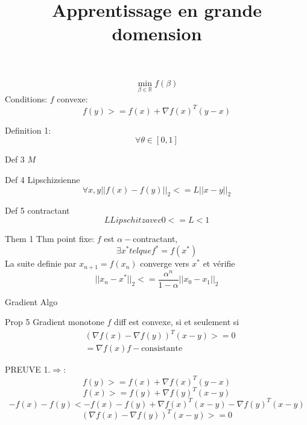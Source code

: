\documentclass{article}
\title{Apprentissage en grande domension}
\begin{document}
\maketitle
\pagebreak

\begin{equation}
\min_{\beta\in\mathbb{R}} f(\beta)
\end{equation}
Conditions:
$f$ convexe:
\begin{equation}
f(y)>=f(x)+\nabla f(x)^T(y-x)
\end{equation}


Definition 1:
\begin{equation}
\forall \theta\in [0,1]
\end{equation}


Def 3 $M$ 

Def 4 Lipschizsienne
\begin{equation}
\forall x,y ||f(x)-f(y)||_2<=L||x-y||_2
\end{equation}

Def 5 contractant
\begin{equation}
L Lipschitz avec 0<=L<1
\end{equation}

Them 1 Thm point fixe:
$f$ est $\alpha -$contractant,
\begin{equation}
\exists x^* tel que f^*=f(x^*)
\end{equation}
La suite definie par $x_{n+1}=f(x_n)$ converge vers $x^*$ et v\'erifie 
\begin{equation}
||x_n-x^*||_2<=\frac{\alpha^n}{1-\alpha}||x_0-x_1||_2
\end{equation}

Gradient Algo

Prop 5 Gradient monotone
$f$ diff est convexe, si et seulement si
\begin{equation}
\begin{split}
&(\nabla f(x)-\nabla f(y))^T(x-y)>=0 \\
&=\nabla f(x) f-\text{consistante}
\end{split}
\end{equation}

PREUVE
1.$\Rightarrow$:
\begin{equation}
f(y)>=f(x)+\nabla f(x)^T(y-x)
\end{equation}
\begin{equation}
f(x)>=f(y)+\nabla f(y)^T(x-y)
\end{equation}
\begin{equation}
-f(x)-f(y)<-f(x)-f(y)+\nabla f(x)^T(x-y)-\nabla f(y)^T (x-y)
\end{equation}
\begin{equation}
(\nabla f(x)-\nabla f(y))^T (x-y)>=0
\end{equation}
\end{document}

